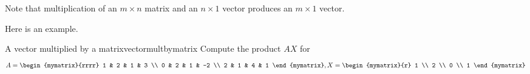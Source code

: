 Note that multiplication of an $m \times n$ matrix and an $n \times 1$ vector produces an $m \times 1$ vector.

Here is an example.

\begin{example}{A vector multiplied by a matrix}{vectormultbymatrix}
Compute the product $AX$ for 
\begin{equation*}
A = \begin{mymatrix}{rrrr}
1 & 2 & 1 & 3 \\
0 & 2 & 1 & -2 \\
2 & 1 & 4 & 1
\end{mymatrix}, X =  \begin{mymatrix}{r}
1 \\
2 \\
0 \\
1
\end{mymatrix} 
\end{equation*}
\end{example}


